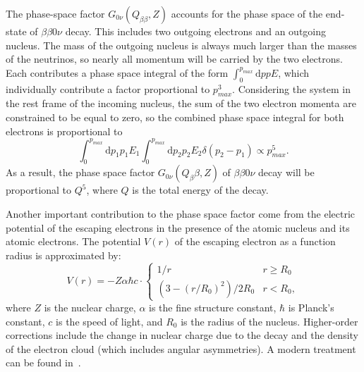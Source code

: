 The phase-space factor $G_{0\nu}(Q_{\beta\beta}, Z)$ accounts for the phase space of the end-state of $\beta\beta 0\nu$ decay.  This includes two outgoing electrons and an outgoing nucleus.  The mass of the outgoing nucleus is always much larger than the masses of the neutrinos, so nearly all momentum will be carried by the two electrons.  Each contributes a phase space integral of the form $\int_0^{p_{max}} \mathrm{d}p pE$, which individually contribute a factor proportional to $p_{max}^3$.  Considering the system in the rest frame of the incoming nucleus, the sum of the two electron momenta are constrained to be equal to zero, so the combined phase space integral for both electrons is proportional to
\begin{equation}
\int_0^{p_{max}} \mathrm{d}p_1 p_1E_1 \int_0^{p_{max}} \mathrm{d}p_2 p_2E_2 \delta(p_2-p_1) \propto p_{max}^5.
\end{equation}
As a result, the phase space factor $G_{0\nu}(Q_\beta\beta, Z)$ of $\beta\beta 0\nu$ decay will be proportional to $Q^5$, where $Q$ is the total energy of the decay.~\cite{mohapatra1998massive}

Another important contribution to the phase space factor come from the electric potential of the escaping electrons in the presence of the atomic nucleus and its atomic electrons.  The potential $V(r)$ of the escaping electron as a function radius is approximated by:~\cite{PhysRevC.87.014315}
\begin{equation}
V(r) = -Z \alpha \hbar c \cdot \begin{cases}
1/r & r \ge R_0 \\
\left(3-(r/R_0)^2\right)/2R_0 & r < R_0,
\end{cases}
\end{equation}
where $Z$ is the nuclear charge, $\alpha$ is the fine structure constant, $\hbar$ is Planck's constant, $c$ is the speed of light, and $R_0$ is the radius of the nucleus.  Higher-order corrections include the change in nuclear charge due to the decay and the density of the electron cloud (which includes angular asymmetries).  A modern treatment can be found in~\cite{PhysRevC.87.014315}.

